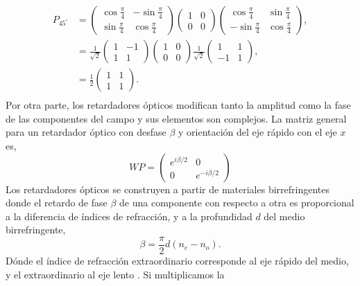 \begin{align*}
P_{45^{\circ}}
&=
\begin{pmatrix}
  \cos{\frac{\pi}{4}} &-\sin{\frac{\pi}{4}}\\\sin{\frac{\pi}{4}}&\cos{\frac{\pi}{4}}
\end{pmatrix}
\begin{pmatrix}
1 & 0 \\0& 0
\end{pmatrix}
\begin{pmatrix}
  \cos{\frac{\pi}{4}} &\sin{\frac{\pi}{4}}\\-\sin{\frac{\pi}{4}}&\cos{\frac{\pi}{4}}
\end{pmatrix},\\
&=
\frac{1}{\sqrt{2}}
\begin{pmatrix}
  1&-1\\1&1
\end{pmatrix}
\begin{pmatrix}
1 & 0 \\0& 0
\end{pmatrix}
\frac{1}{\sqrt{2}}
\begin{pmatrix}
1 &1\\-1&1
\end{pmatrix},\\
&=
\frac{1}{2}
\begin{pmatrix}
1 &1\\1&1
\end{pmatrix}.\\
\end{align*}
Por otra parte, los retardadores ópticos modifican tanto la amplitud
como la fase de las componentes del campo y sus elementos son
complejos. La matriz general para un retardador óptico con desfase
$\beta $ y orientación del eje rápido con el eje
$x$ es,
\begin{equation}
WP = 
\begin{pmatrix}
e^{i\beta/2} & 0 \\0&e^{-i\beta/2}  
\end{pmatrix}
\label{eq:retarder}
\end{equation}
Los retardadores ópticos se construyen a partir de materiales
birrefringentes donde el retardo de fase $\beta$ de una componente con respecto a otra es
proporcional a la diferencia de índices de refracción, y a la
profundidad $d$ del medio birrefringente,
$$\beta= \frac{\pi}{2}d\left(n_e-n_o\right).$$ 
Dónde el índice de refracción extraordinario corresponde al eje rápido
del medio, y el extraordinario al eje lento . Si multiplicamos la
